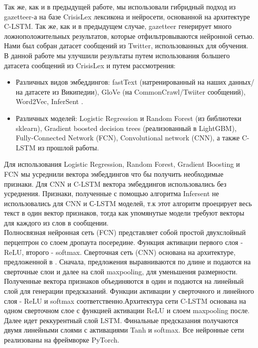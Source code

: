 \documentclass[unicode, 12pt, a4paper,oneside]{article}
\begin{document}
	Так же, как и в предыдущей работе, мы использовали гибридный подход из gazetteer-а на базе CrisisLex\cite{crisislex} лексикона и нейросети, основанной на архитектуре C-LSTM. Так же, как и в предыдущем случае, gazetteer генерирует много ложноположительных результатов, которые отфильтровываются нейронной сетью. Нами был собран датасет сообщений из Twitter, использованных для обучения. В данной работе мы улучшили результаты путем использования большего датасета сообщений из CrisisLex и путем рассмотрения:
\begin{itemize}
\item Различных видов эмбеддингов: fastText \cite{fasttext} (натренированный на наших данных/на датасете из Википедии), GloVe\cite{glove} (на  CommonCrawl/Twiiter сообщений), Word2Vec\cite{word2vec}, InferSent \cite{infersent}.
\item Различных моделей: Logistic Regression и Random Forest (из библиотеки sklearn), Gradient boosted decision trees (реализованный в LightGBM\cite{lightgbm}), Fully-Connected Network (FCN), Convolutional network (CNN), а также C-LSTM из прошлой работы.
\end{itemize}

	Для использования Logistic Regression, Random Forest, Gradient Boosting и FCN мы усреднили вектора эмбеддингов что бы получить необходимые признаки. Для CNN и C-LSTM вектора эмбеддингов использовались без усреднения. Признаки, полученные с помощью алгоритма Infersent не использовались для CNN и С-LSTM моделей, т.к этот алгоритм проецирует весь текст в один вектор признаков, тогда как упомянутые модели требуют векторы для каждого из слов в сообщении.\\
	Полносвязная нейронная сеть (FCN) представляет собой простой двухслойный перцептрон со слоем дропаута посередине. Функция активации первого слоя - ReLU, второго - softmax. Сверточная сеть (CNN) основана на архитектуре, предложенной в \cite{cnn}. Сначала, предложения выравниваются по длине и подаются на сверточные слои и далее на слой maxpooling, для уменьшения размерности. Полученные вектора признаков объединяются в один и подаются на линейный слой для генерации предсказаний. Функции активации у сверточного и линейного слоя - ReLU и softmax соответственно.Архитектура сети C-LSTM основана на одном сверточном слое с функцией активации ReLU и слоем maxpooling после. Далее идет реккурентный слой LSTM. Финальные предсказания получаются двумя линейными слоями с активациями Tanh и softmax. Все нейронные сети реализованы на фреймворке PyTorch\cite{pytorch}.
\end{document}
